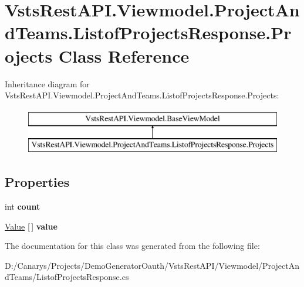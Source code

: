 \hypertarget{class_vsts_rest_a_p_i_1_1_viewmodel_1_1_project_and_teams_1_1_listof_projects_response_1_1_projects}{}\section{Vsts\+Rest\+A\+P\+I.\+Viewmodel.\+Project\+And\+Teams.\+Listof\+Projects\+Response.\+Projects Class Reference}
\label{class_vsts_rest_a_p_i_1_1_viewmodel_1_1_project_and_teams_1_1_listof_projects_response_1_1_projects}
Inheritance diagram for Vsts\+Rest\+A\+P\+I.\+Viewmodel.\+Project\+And\+Teams.\+Listof\+Projects\+Response.\+Projects\+:\begin{figure}[H]
\begin{center}
\leavevmode
\includegraphics[height=2.000000cm]{class_vsts_rest_a_p_i_1_1_viewmodel_1_1_project_and_teams_1_1_listof_projects_response_1_1_projects}
\end{center}
\end{figure}
\subsection*{Properties}
\begin{DoxyCompactItemize}
\item 
\mbox{\label{class_vsts_rest_a_p_i_1_1_viewmodel_1_1_project_and_teams_1_1_listof_projects_response_1_1_projects_a8638df4a5290bea231a3be01c79e85de}} 
int {\bfseries count}
\item 
\mbox{\label{class_vsts_rest_a_p_i_1_1_viewmodel_1_1_project_and_teams_1_1_listof_projects_response_1_1_projects_a36c9f352d4f57dc5259b4ebee169b389}} 
\mbox{\hyperlink{class_vsts_rest_a_p_i_1_1_viewmodel_1_1_project_and_teams_1_1_listof_projects_response_1_1_value}{Value}} \mbox{[}$\,$\mbox{]} {\bfseries value}
\end{DoxyCompactItemize}


The documentation for this class was generated from the following file\+:\begin{DoxyCompactItemize}
\item 
D\+:/\+Canarys/\+Projects/\+Demo\+Generator\+Oauth/\+Vsts\+Rest\+A\+P\+I/\+Viewmodel/\+Project\+And\+Teams/Listof\+Projects\+Response.\+cs\end{DoxyCompactItemize}
